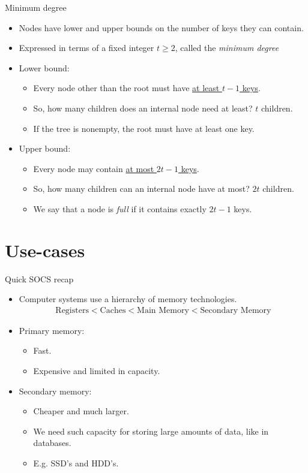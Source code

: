 \documentclass[11pt,t]{beamer}
\begin{document}
	\begin{frame}{Minimum degree}
		\begin{itemize}[<+->]
			\item Nodes have lower and upper bounds on the number of keys they can contain.
			\item Expressed in terms of a fixed integer \(t \geq 2\), called the \textit{minimum degree}
			\item Lower bound: \begin{itemize}[<+->\enspace]
				\item Every node other than the root must have \underline{at least \(t-1\) keys}.
				\item So, how many children does an internal node need at least? \onslide<+-> \(t\) children.
				\item If the tree is nonempty, the root must have at least one key.
			\end{itemize}
			\item Upper bound: \begin{itemize}[<+->\enspace]
				\item Every node may contain \underline{at most \(2t-1\) keys}.
				\item So, how many children can an internal node have at most? \onslide<+-> \(2t\) children.
				\item We say that a node is \textit{full} if it contains exactly \(2t-1\) keys.
			\end{itemize}
		\end{itemize}
	\end{frame}

	\section{Use-cases}

	\begin{frame}{Quick SOCS recap}
		\begin{itemize}[<+->]
			\item Computer systems use a hierarchy of memory technologies. \onslide<+-> \begin{align*}
				\text{Registers} < \text{Caches} < \text{Main Memory} < \text{Secondary Memory}
			\end{align*}
			\item Primary memory: \begin{itemize}[<+->]
				\item Fast.
				\item Expensive and limited in capacity.
			\end{itemize}
			\item Secondary memory: \begin{itemize}[<+->]
				\item Cheaper and much larger.
				\item We need such capacity for storing large amounts of data, like in databases.
				\item E.g. SSD's and HDD's.
			\end{itemize}
		\end{itemize}
	\end{frame}
\end{document}
